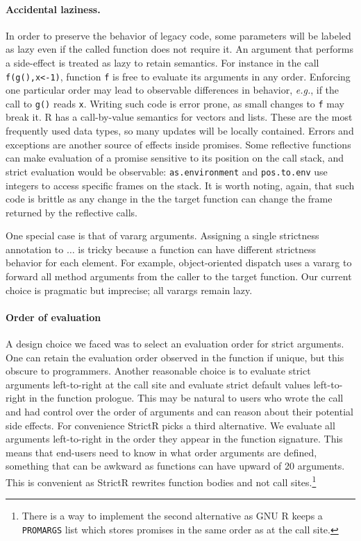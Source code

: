 \documentclass[review,creen,acmsmall]{acmart}
\renewcommand{\c}[1]{\lstinline |#1|\xspace}
\newcommand{\strictr}{{\sf StrictR}\xspace}
\newcommand{\eg}{\emph{e.g.},\xspace}
\begin{document}
\paragraph{Accidental laziness.} In order to preserve the behavior of legacy
code, some parameters will be labeled as lazy even if the called function does
not require it. An argument that performs a side-effect is treated as lazy to
retain semantics. For instance in the call \c{f(g(),x<-1)}, function \c f is
free to evaluate its arguments in any order. Enforcing one particular order may
lead to observable differences in behavior, \eg if the call to \c{g()} reads
\c{x}. Writing such code is error prone, as small changes to \c f may break it.
R has a call-by-value semantics for vectors and lists. These are the most
frequently used data types, so many updates will be locally contained. Errors
and exceptions are another source of effects inside promises. Some reflective
functions can make evaluation of a promise sensitive to its position on the call
stack, and strict evaluation would be observable: \c{as.environment} and
\c{pos.to.env} use integers to access specific frames on the stack. It is
worth noting, again, that such code is brittle as any change in the the target
function can change the frame returned by the reflective calls.

One special case is that of vararg arguments. Assigning a single strictness
annotation to $\dots$ is tricky because a function can have different strictness
behavior for each element. For example, object-oriented dispatch uses a vararg
to forward all method arguments from the caller to the target function.
Our current choice is pragmatic but imprecise; all varargs remain lazy.


\paragraph{Order of evaluation} A design choice we faced
was to select an evaluation order for strict arguments. One can retain the
evaluation order observed in the function if unique, but this obscure to
programmers. Another reasonable choice is to evaluate strict arguments
left-to-right at the call site and evaluate strict default values left-to-right
in the function prologue. This may be natural to users who wrote the call and
had control over the order of arguments and can reason about their potential
side effects. For convenience \strictr picks a third alternative. We evaluate
all arguments left-to-right in the order they appear in the function signature.
This means that end-users need to know in what order arguments are defined,
something that can be awkward as functions can have upward of 20 arguments. This
is convenient as \strictr rewrites function bodies and not call
sites.\footnote{There is a way to implement the second alternative as GNU R
keeps a \c{PROMARGS} list which stores promises in the same order as at the call
site.}
\end{document}
